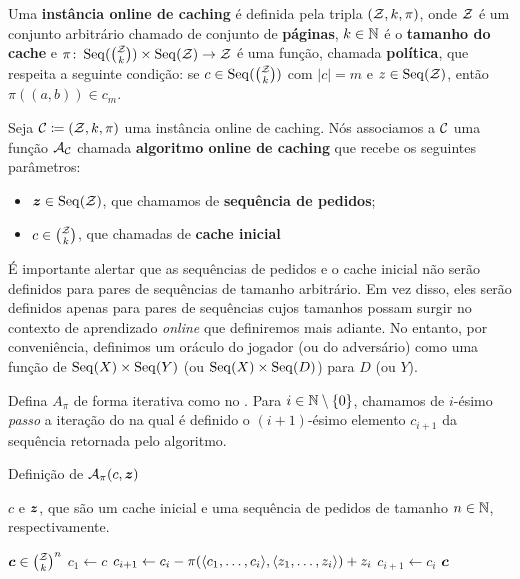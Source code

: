 \begin{definition}
  \label{def:cache}
  Uma \textbf{instância online de caching} é definida pela tripla \((\mathcal{Z}, k, \pi) \), onde \(\mathcal{Z}\) é um conjunto arbitrário chamado de conjunto de \textbf{páginas}, \(k \in \mathbb{N}\) é o \textbf{tamanho do cache} e \(\pi \colon \operatorname{Seq}(\binom{\mathcal{Z}}{k}) \times \operatorname{Seq}(\mathcal{Z}) \to \mathcal{Z}\) é uma função, chamada \textbf{política}, que respeita a seguinte condição: se \(c \in \operatorname{Seq}(\binom{\mathcal{Z}}{k})\) com \(|c| = m\) e \(z \in \operatorname{Seq}(\mathcal{Z})\), então \(\pi((a,b)) \in c_m\).
\end{definition}

Seja \(\mathcal{C} \coloneq (\mathcal{Z}, k, \pi)\) uma instância online de caching. Nós associamos a \(\mathcal{C}\) uma função \(\mathcal{A}_{\mathcal{C}}\) chamada \textbf{algoritmo online de caching} que recebe os seguintes parâmetros:
  \begin{itemize}
    \item \(\bm{z} \in \operatorname{Seq}(\mathcal{Z})\), que chamamos de \textbf{sequência de pedidos};
    \item \(c \in \binom{\mathcal{Z}}{k}\), que chamadas de \textbf{cache inicial}
  \end{itemize}

É importante alertar que as sequências de pedidos e o cache inicial não serão definidos para pares de sequências de tamanho arbitrário. Em vez disso, eles serão definidos apenas para pares de sequências cujos tamanhos possam surgir no contexto de aprendizado \emph{online} que definiremos mais adiante. No entanto, por conveniência, definimos um oráculo do jogador (ou do adversário) como uma função de \(\operatorname{Seq}(X) \times \operatorname{Seq}(Y)\) (ou \(\operatorname{Seq}(X) \times \operatorname{Seq}(D)\)) para \(D\) (ou \(Y\)).

Defina \(A_\pi\) de forma iterativa como no . Para \(i \in \mathbb{N} \setminus \{0\}\), chamamos de \(i\)-ésimo \emph{passo} a iteração do  na qual é definido o \((i+1)\)-ésimo elemento \(c_{i+1}\) da sequência retornada pelo algoritmo.

\begin{algorithm}
  \caption{Definição de \(\mathcal{A}_\pi(c, \bm{z})\)}
  \label{algo:cache}
  \begin{algorithmic}
    \Require \(c\) e \(\bm{z}\), que são um cache inicial e uma sequência de pedidos de tamanho \(n \in \mathbb{N}\), respectivamente.

    \Ensure \(\bm{c} \in \binom{\mathcal{Z}}{k}^n\)
    \State \(c_1 \gets c\)
    \State \(c_{i+1} \gets c_{i} - \pi(\langle c_1, \dotsc, c_{i}\rangle, \langle z_1, \dotsc, z_{i}\rangle) + z_i \)
    \Else
    \State \(c_{i+1} \gets c_i\)
    \EndIf
    \EndFor
    \State \Return \(\bm{c}\)
  \end{algorithmic}
\end{algorithm}

